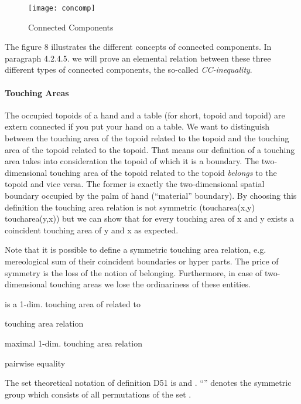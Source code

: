 \documentclass{ao2e}
\begin{document}
{\begin{figure}[H]
\centering
\texttt{[image: concomp]}
\caption{Connected Components}
\label{concomp}
\end{figure}

The figure 8 illustrates the different concepts of connected components. In paragraph 4.2.4.5. we will prove an elemental relation between these three different types of connected components, the so-called \textit{CC-inequality}.
\paragraph{Touching Areas} 

The occupied topoids of a hand and a table (for short, topoid and topoid) are extern connected if you put your hand
on a table. We want to distinguish between the touching area of the topoid related to the
topoid and the touching area of the topoid related to the topoid. That means our
definition of a touching area takes into consideration the topoid of which it is a boundary.
The two-dimensional touching
area of the topoid related to the topoid \textit{belongs} to the
topoid and vice versa. The former is exactly the two-dimensional spatial boundary occupied by the palm of hand (``material'' boundary). By choosing this definition the touching area relation is not
symmetric (toucharea(x,y)  toucharea(y,x)) but we can show that for every touching area
of x and y exists a coincident touching area of y and x as expected.

Note that it is possible to define a symmetric touching area relation, e.g. mereological
sum of their coincident boundaries or hyper parts. The price of symmetry is the loss
of the notion of belonging. Furthermore, in case of two-dimensional touching areas we lose
the ordinariness of these entities.

\begin{enumAx}[D]

\itemTP{\1ex] \mbox{}}
             { is a 1-dim. touching area of  related to }
             
\itemTP{\1ex] \mbox{}}
             {touching area relation}
             
\itemTP{\1ex] \mbox{}}
             {maximal 1-dim. touching area relation}               
             
\itemTP{\1ex] \mbox{}}
             {pairwise equality} 
\end{enumAx}

The set theoretical notation of definition D51 is  and . ``'' denotes the symmetric group which consists of all permutations  of the set .               
\begin{enumAx} [D]
             

\end{enumAx}}
\end{document}
